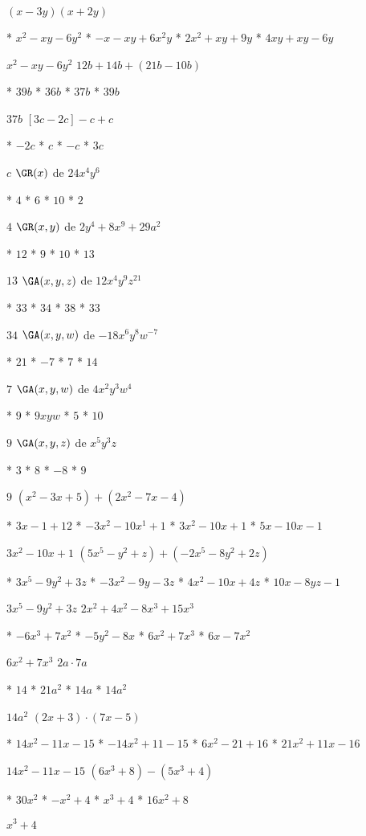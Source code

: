 $(x-3y)(x+2y)$
\begin{enum}
	* $x^2-xy-6y^2$
	* $-x-xy+6x^2y$
	* $2x^2+xy+9y$
	* $4xy+xy-6y$
\end{enum}
$x^2-xy-6y^2$
$12b+14b+(21b-10b)$
\begin{enum}
	* $39b$
	* $36b$
	* $37b$
	* $39b$
\end{enum}
$37b$
$[3c-2c]-c+c$
\begin{enum}
	* $-2c$
	* $c$
	* $-c$
	* $3c$
\end{enum}
$c$
$\GR(x)$ de $24x^4y^6$
\begin{enum}
	* $4$
	* $6$
	* $10$
	* $2$
\end{enum}
$4$
$\GR(x,y)$ de $2y^4+8x^9+29a^2$
\begin{enum}
	* $12$
	* $9$
	* $10$
	* $13$
\end{enum}
$13$
$\GA(x,y,z)$ de $12x^4y^9z^{21}$
\begin{enum}
	* $33$
	* $34$
	* $38$
	* $33$
\end{enum}
$34$
$\GA(x,y,w)$ de $-18x^6y^8w^{-7}$
\begin{enum}
	* $21$
	* $-7$
	* $7$
	* $14$
\end{enum}
$7$
$\GA(x,y,w)$ de $4x^2y^3w^4$
\begin{enum}
	* $9$
	* $9xyw$
	* $5$
	* $10$
\end{enum}
$9$
$\GA(x,y,z)$ de $x^5y^3z$
\begin{enum}
	* $3$
	* $8$
	* $-8$
	* $9$
\end{enum}
$9$
$\left(x^2-3x+5\right)+\left(2x^2-7x-4\right)$
\begin{enum}
	* $3x-1+12$
	* $-3x^2-10x^1+1$
	* $3x^2-10x+1$
	* $5x-10x-1$
\end{enum}
$3x^2-10x+1$
$\left(5x^5-y^2+z\right)+\left(-2x^5-8y^2+2z\right)$
\begin{enum}
	* $3x^5-9y^2+3z$
	* $-3x^2-9y-3z$
	* $4x^2-10x+4z$
	* $10x-8yz-1$
\end{enum}
$3x^5-9y^2+3z$
$2x^2+4x^2-8x^3+15x^3$
\begin{enum}
	* $-6x^3+7x^2$
	* $-5y^2-8x$
	* $6x^2+7x^3$
	* $6x-7x^2$
\end{enum}
$6x^2+7x^3$
$2a\cdot 7a$
\begin{enum}
	* $14$
	* $21a^2$
	* $14a$
	* $14a^2$
\end{enum}
$14a^2$
$(2x+3)\cdot(7x-5)$
\begin{enum}
	* $14x^2-11x-15$
	* $-14x^2+11-15$
	* $6x^2-21+16$
	* $21x^2+11x-16$
\end{enum}
$14x^2-11x-15$
$\left(6x^3+8\right)-\left(5x^3+4\right)$
\begin{enum}
	* $30x^2$
	* $-x^2+4$
	* $x^3+4$
	* $16x^2+8$
\end{enum}
$x^3+4$
